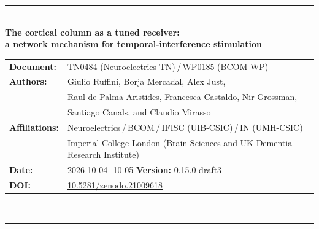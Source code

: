 \documentclass[11pt,a4paper]{article}
\newif\ifsupp
\newcommand{\paperver}{0.15.0-draft3} %
\providecommand{\DIFaddtex}[1]{{\protect\color{blue} \sf #1}} %
\providecommand{\DIFdeltex}[1]{{\protect\color{red} \scriptsize #1}} %
\providecommand{\DIFaddbegin}{} %
\providecommand{\DIFaddend}{} %
\providecommand{\DIFdelbegin}{} %
\providecommand{\DIFdelend}{} %
\providecommand{\DIFadd}[1]{\texorpdfstring{\DIFaddtex{#1}}{#1}} %
\providecommand{\DIFdel}[1]{\texorpdfstring{\DIFdeltex{#1}}{}} %
\begin{document}
\vspace{6pt}
\else
\begin{flushleft}
{\color{neblue}\rule{\textwidth}{2pt}}\\[4pt]
{\LARGE\bfseries The cortical column as a tuned receiver:\\[2pt]
a network mechanism for temporal-interference stimulation}\\[10pt]
\begin{tabular}{@{}ll@{}}
\textbf{Document:} & TN0484 (Neuroelectrics TN)\,/\,WP0185 (BCOM WP) \\
\textbf{Authors:} & Giulio Ruffini, Borja Mercadal, Alex Just,\\
& Raul de Palma Aristides, Francesca Castaldo, Nir Grossman,\\
& Santiago Canals, and Claudio Mirasso \\
\textbf{Affiliations:} & Neuroelectrics\,/\,BCOM\,/\,IFISC (UIB-CSIC)\,/\,IN (UMH-CSIC)\\
& Imperial College London (Brain Sciences and UK Dementia Research Institute) \\
\textbf{Date:} & \DIFdelbegin \DIFdel{2026-10-04 }\DIFdelend \DIFaddbegin \DIFadd{2026-10-05 }\DIFaddend \qquad \textbf{Version:} \paperver \\
\textbf{DOI:} & \href{https://doi.org/10.5281/zenodo.21009618}{10.5281/zenodo.21009618} \\
\end{tabular}\\[4pt]
{\color{neblue}\rule{\textwidth}{1pt}}
\end{flushleft}
\fi

\ifsupp
\begin{center}
{\large\bfseries Supplementary Material}\\[4pt]
\begin{minipage}{0.86\textwidth}\centering\small
Appendices and supplementary figures accompanying the article. Section, equation and
figure numbers referenced here follow the main text; supplementary figures are numbered
S1, S2, \dots
\end{minipage}
\end{center}
\vspace{8pt}
\fi

\ifsupp\else
\end{document}
